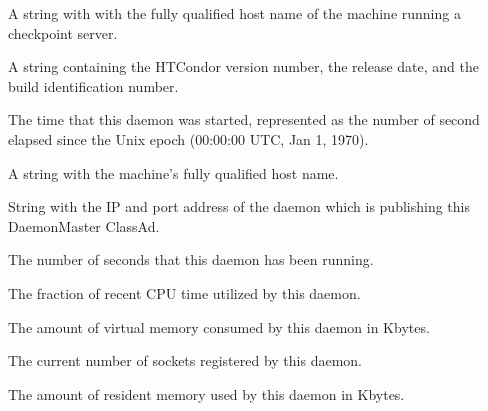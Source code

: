 \begin{description}

\item[\AdAttr{CkptServer}:] A string with with the fully qualified
  host name of the machine running a checkpoint server.

\item[\AdAttr{CondorVersion}:] A string containing the HTCondor version
number, the release date, and the build identification number.

\item[\AdAttr{DaemonStartTime}:] The time that this daemon was
  started, represented as the number of second elapsed since
  the Unix epoch (00:00:00 UTC, Jan 1, 1970).

\item[\AdAttr{Machine}:] A string with the machine's fully qualified 
  host name.

\item[\AdAttr{MasterIpAddr}:] String with the IP and port address of the
 daemon which is publishing this DaemonMaster ClassAd.

\item[\AdAttr{MonitorSelfAge}:] The number of seconds that this daemon
  has been running.

\item[\AdAttr{MonitorSelfCPUUsage}:] The fraction of recent CPU time utilized
  by this daemon. 

\item[\AdAttr{MonitorSelfImageSize}:] The amount of virtual memory consumed by
  this daemon in Kbytes.

\item[\AdAttr{MonitorSelfRegisteredSocketCount}:] The current number of sockets
  registered by this daemon.

\item[\AdAttr{MonitorSelfResidentSetSize}:] The amount of resident memory
  used by this daemon in Kbytes.


\end{description}
